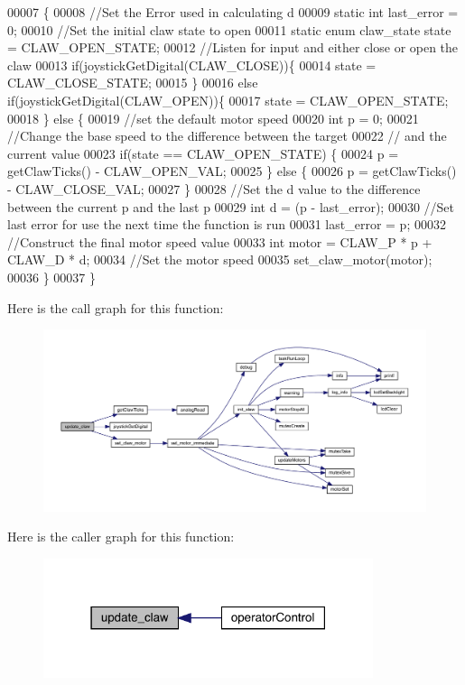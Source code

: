 \begin{DoxyCode}
00007                    \{
00008   \textcolor{comment}{//Set the Error used in calculating d}
00009   \textcolor{keyword}{static} \textcolor{keywordtype}{int} last\_error = 0;
00010   \textcolor{comment}{//Set the initial claw state to open}
00011   \textcolor{keyword}{static} \textcolor{keyword}{enum} claw_state state = CLAW_OPEN_STATE;
00012   \textcolor{comment}{//Listen for input and either close or open the claw}
00013   \textcolor{keywordflow}{if}(joystickGetDigital(CLAW_CLOSE))\{
00014     state = CLAW_CLOSE_STATE;
00015   \}
00016   \textcolor{keywordflow}{else} \textcolor{keywordflow}{if}(joystickGetDigital(CLAW_OPEN))\{
00017     state = CLAW_OPEN_STATE;
00018   \} \textcolor{keywordflow}{else} \{
00019     \textcolor{comment}{//set the default motor speed}
00020     \textcolor{keywordtype}{int} p = 0;
00021     \textcolor{comment}{//Change the base speed to the difference between the target}
00022     \textcolor{comment}{// and the current value}
00023     \textcolor{keywordflow}{if}(state == CLAW_OPEN_STATE) \{
00024       p = getClawTicks() - CLAW_OPEN_VAL;
00025     \} \textcolor{keywordflow}{else} \{
00026       p = getClawTicks() - CLAW_CLOSE_VAL;
00027     \}
00028     \textcolor{comment}{//Set the d value to the difference between the current p and the last p}
00029     \textcolor{keywordtype}{int} d = (p - last\_error);
00030     \textcolor{comment}{//Set last error for use the next time the function is run}
00031     last\_error = p;
00032     \textcolor{comment}{//Construct the final motor speed value}
00033     \textcolor{keywordtype}{int} motor = CLAW_P * p + CLAW_D * d;
00034     \textcolor{comment}{//Set the motor speed}
00035     set_claw_motor(motor);
00036   \}
00037 \}
\end{DoxyCode}
Here is the call graph for this function\+:\nopagebreak
\begin{figure}[H]
\begin{center}
\leavevmode
\includegraphics[width=350pt]{claw_8c_a0122b78972344264b8a276a559cfce4a_cgraph}
\end{center}
\end{figure}
Here is the caller graph for this function\+:\nopagebreak
\begin{figure}[H]
\begin{center}
\leavevmode
\includegraphics[width=274pt]{claw_8c_a0122b78972344264b8a276a559cfce4a_icgraph}
\end{center}
\end{figure}
